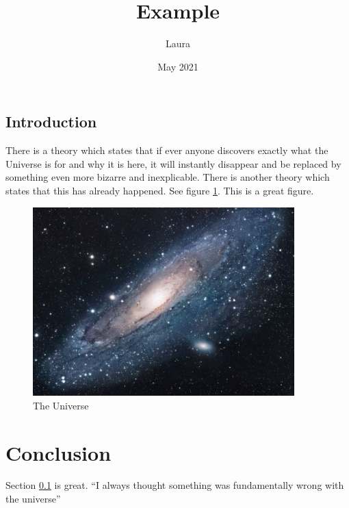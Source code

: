 \documentclass{article}
\title{Example}
\author{Laura }
\date{May 2021}
\begin{document}
\maketitle
\tableofcontents

\subsection{Introduction}\label{sec:intro}
There is a theory which states that if ever anyone discovers exactly what the Universe is for and why it is here, it will instantly disappear and be replaced by something even more bizarre and inexplicable.
There is another theory which states that this has already happened. See figure \ref{fig:universe}. This is a great figure.




\begin{figure}[h!]
\centering
\includegraphics[width=0.9\textwidth]{universe}
\caption{The Universe}
\label{fig:universe}
\end{figure}

\section{Conclusion}
Section \ref{sec:intro} is great. ``I always thought something was fundamentally wrong with the universe'' \citep{adams1995hitchhiker}



\end{document}
